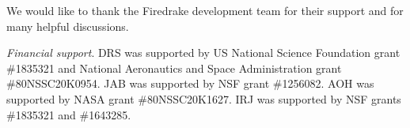 \documentclass[journal abbreviation, manuscript]{copernicus}
\begin{document}
\appendixtables   %






\begin{acknowledgements}
We would like to thank the Firedrake development team for their support and for many helpful discussions.
\end{acknowledgements}

\textit{Financial support}.
DRS was supported by US National Science Foundation grant \#1835321 and National Aeronautics and Space Administration grant \#80NSSC20K0954.
JAB was supported by NSF grant \#1256082.
AOH was supported by NASA grant \#80NSSC20K1627.
IRJ was supported by NSF grants \#1835321 and \#1643285.












\end{document}
